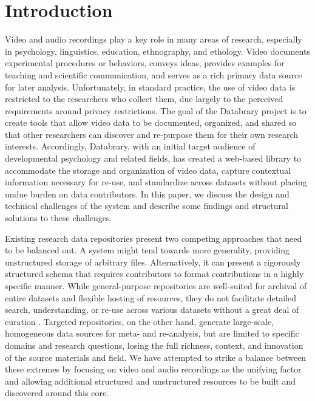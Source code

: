 \documentclass{sig-alternate}
\begin{document}


\section{Introduction}

Video and audio recordings play a key role in many areas of research, especially in psychology, linguistics, education, ethnography, and ethology.
Video documents experimental procedures or behaviors, conveys ideas, provides examples for teaching and scientific communication, and serves as a rich primary data source for later analysis.
Unfortunately, in standard practice, the use of video data is restricted to the researchers who collect them, due largely to the perceived requirements around privacy restrictions.
The goal of the Databrary project is to create tools that allow video data to be documented, organized, and shared so that other researchers can discover and re-purpose them for their own research interests.
Accordingly, Databrary, with an initial target audience of developmental psychology and related fields, has created a web-based library to accommodate the storage and organization of video data, capture contextual information necessary for re-use, and standardize across datasets without placing undue burden on data contributors.
In this paper, we discuss the design and technical challenges of the system and describe some findings and structural solutions to these challenges.

Existing research data repositories present two competing approaches that need to be balanced out.
A system might tend towards more generality, providing unstructured storage of arbitrary files.
Alternatively, it can present a rigorously structured schema that requires contributors to format contributions in a highly specific manner.
While general-purpose repositories are well-suited for archival of entire datasets and flexible hosting of resources, they do not facilitate detailed search, understanding, or re-use across various datasets without a great deal of curation \cite{Peer_2012}.
Targeted repositories, on the other hand, generate large-scale, homogeneous data sources for meta- and re-analysis, but are limited to specific domains and research questions, losing the full richness, context, and innovation of the source materials and field.
We have attempted to strike a balance between these extremes by focusing on video and audio recordings as the unifying factor and allowing additional structured and unstructured resources to be built and discovered around this core.
\end{document}
